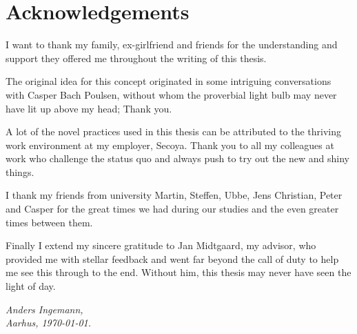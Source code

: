 \documentclass[thesis.tex]{subfiles}
\begin{document}
\chapter*{Acknowledgements}
\label{chap:ack}

I want to thank my family, ex-girlfriend and friends for the understanding and
support they offered me throughout the writing of this thesis.

The original idea for this concept originated in some intriguing conversations
with Casper Bach Poulsen, without whom the proverbial light bulb may never have
lit up above my head; Thank you.

A lot of the novel practices used in this thesis can be attributed to the
thriving work environment at my employer, Secoya.
Thank you to all my colleagues at work who challenge the status quo and always
push to try out the new and shiny things.

I thank my friends from university
Martin, Steffen, Ubbe, Jens Christian, Peter and Casper
for the great times we had during our studies and the even greater times
between them.

Finally I extend my sincere gratitude to Jan Midtgaard, my advisor,
who provided me with stellar feedback and went far beyond the call of duty to
help me see this through to the end. Without him, this thesis may never have
seen the light of day.

\vspace{2ex}
\begin{flushright}
  \emph{Anders Ingemann,}\\
  \emph{Aarhus, \today.}
\end{flushright}
\end{document}
